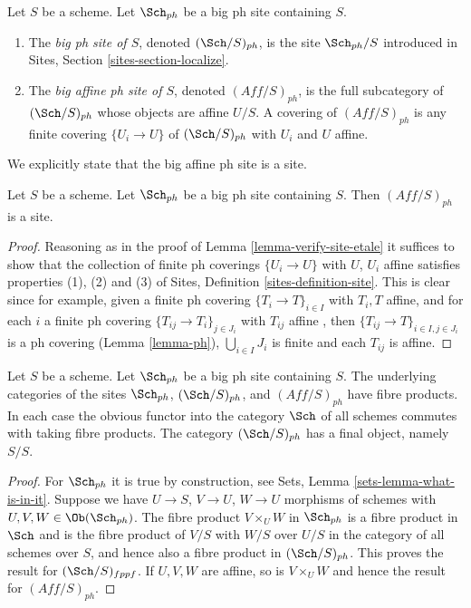 \begin{definition}
\label{definition-big-small-ph}
Let $S$ be a scheme. Let $\Sch_{ph}$ be a big ph site containing $S$.
\begin{enumerate}
\item The {\it big ph site of $S$}, denoted
$(\Sch/S)_{ph}$, is the site $\Sch_{ph}/S$
introduced in Sites, Section \ref{sites-section-localize}.
\item The {\it big affine ph site of $S$}, denoted
$(\textit{Aff}/S)_{ph}$, is the full subcategory of
$(\Sch/S)_{ph}$ whose objects are affine $U/S$.
A covering of $(\textit{Aff}/S)_{ph}$ is any finite covering
$\{U_i \to U\}$ of $(\Sch/S)_{ph}$ with $U_i$ and $U$ affine.
\end{enumerate}
\end{definition}

\noindent
We explicitly state that the big affine ph site is a site.

\begin{lemma}
\label{lemma-verify-site-ph}
Let $S$ be a scheme. Let $\Sch_{ph}$ be a big ph
site containing $S$. Then $(\textit{Aff}/S)_{ph}$ is a site.
\end{lemma}

\begin{proof}
Reasoning as in the proof of Lemma \ref{lemma-verify-site-etale}
it suffices to show that the collection of finite ph coverings
$\{U_i \to U\}$ with $U$, $U_i$ affine satisfies properties
(1), (2) and (3) of
Sites, Definition \ref{sites-definition-site}.
This is clear since for example, given a finite ph covering
$\{T_i \to T\}_{i\in I}$ with $T_i, T$ affine, and for each
$i$ a finite ph covering $\{T_{ij} \to T_i\}_{j\in J_i}$ with $T_{ij}$
affine , then $\{T_{ij} \to T\}_{i \in I, j\in J_i}$ is a ph covering
(Lemma \ref{lemma-ph}), $\bigcup_{i\in I} J_i$ is finite and
each $T_{ij}$ is affine.
\end{proof}

\begin{lemma}
\label{lemma-fibre-products-ph}
Let $S$ be a scheme. Let $\Sch_{ph}$ be a big ph
site containing $S$. The underlying categories of the sites
$\Sch_{ph}$, $(\Sch/S)_{ph}$, and $(\textit{Aff}/S)_{ph}$ have fibre products.
In each case the obvious functor into the category $\Sch$ of
all schemes commutes with taking fibre products. The category
$(\Sch/S)_{ph}$ has a final object, namely $S/S$.
\end{lemma}

\begin{proof}
For $\Sch_{ph}$ it is true by construction, see
Sets, Lemma \ref{sets-lemma-what-is-in-it}.
Suppose we have $U \to S$, $V \to U$, $W \to U$ morphisms
of schemes with $U, V, W \in \Ob(\Sch_{ph})$.
The fibre product $V \times_U W$ in $\Sch_{ph}$
is a fibre product in $\Sch$ and
is the fibre product of $V/S$ with $W/S$ over $U/S$ in
the category of all schemes over $S$, and hence also a
fibre product in $(\Sch/S)_{ph}$.
This proves the result for $(\Sch/S)_{fppf}$.
If $U, V, W$ are affine, so is $V \times_U W$ and hence the
result for $(\textit{Aff}/S)_{ph}$.
\end{proof}

